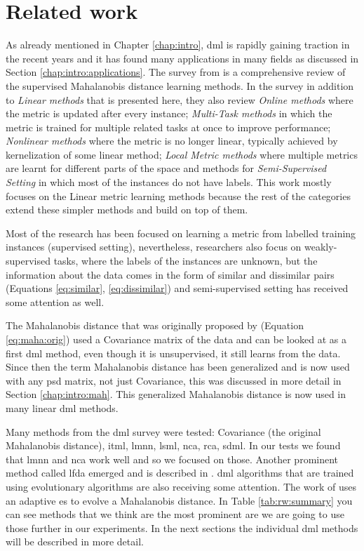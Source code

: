 \documentclass[12pt,a4paper]{report}
\begin{document}
\chapter{Related work} \label{chap:rw}

As already mentioned in Chapter \ref{chap:intro}, \acl{dml} is rapidly gaining traction in the recent years and it has found many applications in many fields as discussed in Section \ref{chap:intro:applications}. The survey from \citep{bellet2013survey} is a comprehensive review of the supervised Mahalanobis distance learning methods. In the survey in addition to \textit{Linear methods} that is presented here, they also review \textit{Online methods} where the metric is updated after every instance; \textit{Multi-Task methods} in which the metric is trained for multiple related tasks at once to improve performance; \textit{Nonlinear methods} where the metric is no longer linear, typically achieved by kernelization of some linear method; \textit{Local Metric methods} where multiple metrics are learnt for different parts of the space and methods for \textit{Semi-Supervised Setting} in which most of the instances do not have labels. This work mostly focuses on the Linear metric learning methods because the rest of the categories extend these simpler methods and build on top of them.

Most of the research has been focused on learning a metric from labelled training instances (supervised setting), nevertheless, researchers also focus on weakly-supervised tasks, where the labels of the instances are unknown, but the information about the data comes in the form of similar and dissimilar pairs (Equations \ref{eq:similar}, \ref{eq:dissimilar}) and semi-supervised setting has received some attention as well.

The Mahalanobis distance that was originally proposed by \citep{mahalanobis1936generalized} (Equation \ref{eq:maha:orig}) used a Covariance matrix of the data and can be looked at as a first \acl{dml} method, even though it is unsupervised, it still learns from the data. Since then the term Mahalanobis distance has been generalized and is now used with any \ac{psd} matrix, not just Covariance, this was discussed in more detail in Section \ref{chap:intro:mah}. This generalized Mahalanobis distance is now used in many linear \acl{dml} methods.

Many methods from the \ac{dml} survey were tested: Covariance (the original Mahalanobis distance), \ac{itml}, \ac{lmnn}, \ac{lsml}, \ac{nca}, \ac{rca}, \ac{sdml}. In our tests we found that \ac{lmnn} and \ac{nca} work well and so we focused on those. Another prominent method called \ac{lfda} emerged and is described in \citep{sugiyama2007dimensionality}. \Acl{dml} algorithms that are trained using evolutionary algorithms are also receiving some attention. The work of \citep{fukui2013evolutionary} uses an adaptive \acl{es} to evolve a Mahalanobis distance. In Table \ref{tab:rw:summary} you can see methods that we think are the most prominent are we are going to use those further in our experiments. In the next sections the individual \acl{dml} methods will be described in more detail.
\end{document}
